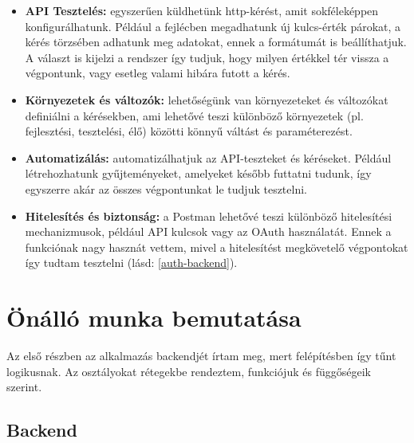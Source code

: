 \documentclass[a4paper,twoside]{article}
\begin{document}
\begin{itemize}
	\item \textbf{API Tesztelés:} egyszerűen küldhetünk http-kérést, amit sokféleképpen konfigurálhatunk. Például a fejlécben megadhatunk új kulcs-érték párokat, a kérés törzsében adhatunk meg adatokat, ennek a formátumát is beállíthatjuk. A választ is kijelzi a rendszer így tudjuk, hogy milyen értékkel tér vissza a végpontunk, vagy esetleg valami hibára futott a kérés. 
	\item \textbf{Környezetek és változók:} lehetőségünk van környezeteket és változókat definiálni a kérésekben, ami lehetővé teszi különböző környezetek (pl. fejlesztési, tesztelési, élő) közötti könnyű váltást és paraméterezést.
	\item \textbf{Automatizálás:} automatizálhatjuk az API-teszteket és kéréseket. Például létrehozhatunk gyűjteményeket, amelyeket később futtatni tudunk, így egyszerre akár az összes végpontunkat le tudjuk tesztelni. 
	\item \textbf{Hitelesítés és biztonság:} a Postman lehetővé teszi különböző hitelesítési mechanizmusok, például API kulcsok vagy az OAuth használatát. Ennek a funkciónak nagy hasznát vettem, mivel a hitelesítést megkövetelő végpontokat így tudtam tesztelni (lásd: \ref{auth-backend}). 
\end{itemize}




\newpage



\section{Önálló munka bemutatása}
Az első részben az alkalmazás backendjét írtam meg, mert felépítésben így tűnt
logikusnak. Az osztályokat rétegekbe rendeztem, funkciójuk és függőségeik szerint.
\subsection{Backend}
\end{document}
